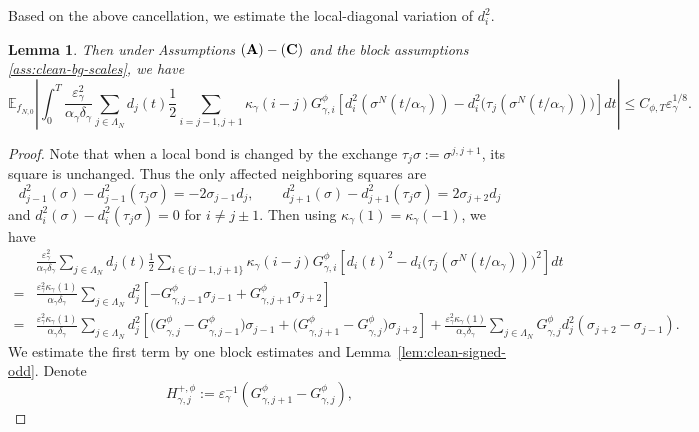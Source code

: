 \documentclass{article}
\newtheorem{lemma}{Lemma}
\begin{document}
Based on the above cancellation, we estimate the local-diagonal variation of \(d_i^2\).

\begin{lemma}\label{lem:clean-local-diagonal}
Then under Assumptions \(({\bf A})-({\bf C})\) and the block assumptions \eqref{ass:clean-bg-scales}, we have
\[
\mathbb E_{f_{N,0}}
\left|
\int_0^T \frac{\varepsilon_\gamma^2}{\alpha_\gamma\delta_\gamma}
\sum_{j\in \Lambda_N}d_j(t)\frac12
\sum_{i=j-1,j+1}
\kappa_\gamma(i-j)G_{\gamma,i}^{\phi}
\left[
d^2_i(\sigma^N(t/\alpha_\gamma))-d^2_i\bigl(\tau_j(\sigma^N(t/\alpha_\gamma))\bigr)
\right] dt
\right| \le C_{\phi,T}\varepsilon^{1/8}_{\gamma}.
\]
\end{lemma}

\begin{proof}
Note that when a local bond is changed by the exchange \(\tau_j\sigma:= \sigma^{j,j+1}\), its square is unchanged.  
Thus the only affected neighboring squares are
\begin{equation}\label{eq:diodd}
    d_{j-1}^2(\sigma)- d_{j-1}^2(\tau_j\sigma)
=-2\sigma_{j-1}d_j,
\qquad
d_{j+1}^2(\sigma)-d_{j+1}^2(\tau_j\sigma)
=2\sigma_{j+2}d_j
\end{equation}
and \(d_i^2(\sigma) - d_i^2(\tau_j\sigma) = 0 \) for $i \neq j\pm1$.
Then using \(\kappa_\gamma(1)=\kappa_\gamma(-1)\), we have
\begin{align}\label{eq:aIDE0}
     & \frac{\varepsilon_\gamma^2}{\alpha_\gamma\delta_\gamma}
\sum_{j\in \Lambda_N}d_j(t)\frac12 \sum_{i\in \{j-1,j+1\} }
\kappa_\gamma(i-j)G_{\gamma,i}^{\phi}\left[d_i(t)^2-d_i\bigl(\tau_j(\sigma^N(t/\alpha_\gamma))\bigr)^2
\right] dt \nonumber\\
= & \frac{\varepsilon_\gamma^2\kappa_\gamma(1)}{\alpha_\gamma\delta_\gamma}
\sum_{j\in \Lambda_N} d_j^2
\left[ -G_{\gamma,j-1}^{\phi}\sigma_{j-1} +G_{\gamma,j+1}^{\phi}\sigma_{j+2} \right] \nonumber\\
 = & \frac{\varepsilon_\gamma^2\kappa_\gamma(1)}{\alpha_\gamma\delta_\gamma}\sum_{j\in \Lambda_N} d_j^2
 \left[\big(G_{\gamma,j}^{\phi} -G_{\gamma,j-1}^{\phi}\big)\sigma_{j-1} + \big(G_{\gamma,j+1}^{\phi} - G_{\gamma,j}^{\phi} \big)\sigma_{j+2} \right] + \frac{\varepsilon_\gamma^2\kappa_\gamma(1)}{\alpha_\gamma\delta_\gamma}\sum_{j\in \Lambda_N}  G_{\gamma,j}^{\phi}d_j^2(\sigma_{j+2}-\sigma_{j-1}).
\end{align}
We estimate the first term by one block estimates and Lemma~\ref{lem:clean-signed-odd}. Denote
\[
H_{\gamma,j}^{+,\phi}:=
\varepsilon_\gamma^{-1}(G_{\gamma,j+1}^{\phi}-G_{\gamma,j}^{\phi}),
\]
\end{proof}
\end{document}
